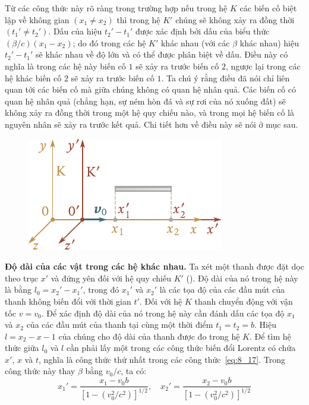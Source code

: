 \noindent
Từ các công thức này rõ ràng trong trường hợp nếu trong hệ $K$ các biến cố biệt lập về không gian $(x_1\neq x_2)$ thì trong hệ $K'$ chúng sẽ không xảy ra đồng thời $(t_1'\neq t_2')$. Dấu của hiệu $t_2'-t_1'$ được xác định bởi dấu của biểu thức $(\beta/c)(x_1-x_2)$; do đó trong các hệ $K'$ khác nhau (với các $\beta$ khác nhau) hiệu $t_2'-t_1'$ sẽ khác nhau về độ lớn và có thể được phân biệt về dấu. Điều này có nghĩa là trong các hệ này biến cố $1$ sẽ xảy ra trước biến cố $2$, ngược lại trong các hệ khác biến cố $2$ sẽ xảy ra trước biến cố $1$. Ta chú ý rằng điều đã nói chỉ liên quan tới các biến cố mà giữa chúng không có quan hệ nhân quả. Các biến cố có quan hệ nhân quả (chẳng hạn, sự ném hòn đá và sự rơi của nó xuống đất) sẽ không xảy ra đồng thời trong một hệ quy chiếu nào, và trong mọi hệ biến cố là nguyên nhân sẽ xảy ra trước kết quả. Chi tiết hơn về điều này sẽ nói ở mục sau.

\begin{figure}[!htb]
	\begin{center}
		\includegraphics[scale=0.95]{figures/ch_08/fig_8_3.pdf}
		\caption[]{}
		\label{fig:8_3}
	\end{center}
\end{figure}

\textbf{Độ dài của các vật trong các hệ khác nhau.} Ta xét một thanh được đặt dọc theo trục $x'$ và đứng yên đối với hệ quy chiếu $K'$ (). Độ dài của nó trong hệ này là bằng $l_0=x_2'-x_1'$, trong đó $x_1'$ và $x_2'$ là các tọa độ của các đầu mút của thanh không biến đổi với thời gian $t'$. Đối với hệ $K$ thanh chuyển động với vận tốc $v=v_0$. Để xác định độ dài của nó trong hệ này cần đánh dấu các tọa độ $x_1$ và $x_2$ của các đầu mút của thanh tại cùng một thời điểm $t_1=t_2=b$. Hiệu $l=x_2-x-1$ của chúng cho độ dài của thanh được đo trong hệ $K$. Để tìm hệ thức giữa $l_0$ và $l$ cần phải lấy một trong các công thức biến đổi Lorentz có chứa $x'$, $x$ và $t$, nghĩa là công thức thứ nhất trong các công thức~\eqref{eq:8_17}. Trong công thức này thay $\beta$ bằng $v_0/c$, ta có:
\begin{equation*}
	x_1' = \frac{x_1 - v_0 b}{\left[1 - \left(v_0^2/c^2\right)\right]^{1/2}},\quad x_2' = \frac{x_2 - v_0 b}{\left[1 - \left(v_0^2/c^2\right)\right]^{1/2}}
\end{equation*}

